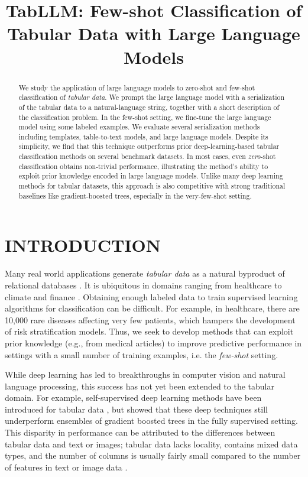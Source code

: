 \title{TabLLM: Few-shot Classification of Tabular Data with Large Language Models}

\begin{abstract}
 We study the application of large language models to zero-shot and few-shot classification of \emph{tabular data}. We prompt the large language model with a serialization of the tabular data to a natural-language string, together with a short description of the classification problem. In the few-shot setting, we fine-tune the large language model using some labeled examples. We evaluate several serialization methods including templates, table-to-text models, and large language models. Despite its simplicity, we find that this technique outperforms prior deep-learning-based tabular classification methods on several benchmark datasets. In most cases, even \emph{zero}-shot classification obtains non-trivial performance, illustrating the method's ability to exploit prior knowledge encoded in large language models. Unlike many deep learning methods for tabular datasets, this approach is also competitive with strong traditional baselines like gradient-boosted trees, especially in the very-few-shot setting.
\end{abstract}

\section{INTRODUCTION}

Many real world applications generate \emph{tabular data} as a natural byproduct of relational databases \citep{shwartz-ziv_tabular_2021}. It is ubiquitous in domains ranging from healthcare to climate and finance  \citep{sahakyan2021explainable}. Obtaining enough labeled data to train supervised learning algorithms for classification can be difficult. For example, in healthcare, there are 10,000 rare diseases \citep{haendel2020many} affecting very few patients, which hampers the development of risk stratification models. Thus, we seek to develop methods that can exploit prior knowledge (e.g., from medical articles) to improve predictive performance in settings with a small number of training examples, i.e. the \emph{few-shot} setting.

While deep learning has led to breakthroughs in computer vision and natural language processing, this success has not yet been extended to the tabular domain. For example, self-supervised deep learning methods have been introduced for tabular data \citep{yin_tabert_2020, arik_tabnet_2021}, but \citet{grinsztajn_why_2022} showed that these deep techniques still underperform ensembles of gradient boosted trees in the fully supervised setting. This disparity in performance can be attributed to the differences between tabular data and text or images; tabular data lacks locality, contains mixed data types, and the number of columns is usually fairly small compared to the number of features in text or image data \citep{borisov_deep_2022}.

